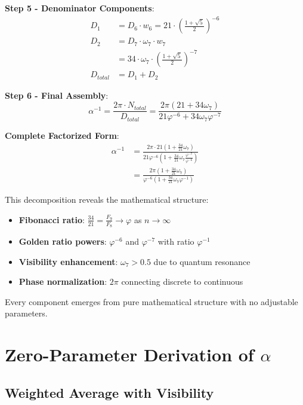 \documentclass[%
 reprint,
 amsmath,amssymb,
 aps,
 prd,
 10pt,
 nofootinbib,      %
 longbibliography  %
]{revtex4-2}
\theoremstyle{definition}
\theoremstyle{remark}
\begin{document}
\textbf{Step 5 - Denominator Components}:
\begin{align}
D_1 &= D_6 \cdot w_6 = 21 \cdot \left(\frac{1+\sqrt{5}}{2}\right)^{-6} \\
D_2 &= D_7 \cdot \omega_7 \cdot w_7 \\
&= 34 \cdot \omega_7 \cdot \left(\frac{1+\sqrt{5}}{2}\right)^{-7} \\
D_{total} &= D_1 + D_2
\end{align}

\textbf{Step 6 - Final Assembly}:
\begin{equation}
\boxed{
\alpha^{-1} = \frac{2\pi \cdot N_{total}}{D_{total}} = \frac{2\pi(21 + 34 \omega_7)}{21 \varphi^{-6} + 34 \omega_7 \varphi^{-7}}
}
\end{equation}

\textbf{Complete Factorized Form}:
\begin{align}
\alpha^{-1} &= \frac{2\pi \cdot 21(1 + \frac{34}{21}\omega_7)}{21 \varphi^{-6}(1 + \frac{34}{21}\omega_7 \frac{\varphi^{-7}}{\varphi^{-6}})} \\
&= \frac{2\pi(1 + \frac{34}{21}\omega_7)}{\varphi^{-6}(1 + \frac{34}{21}\omega_7 \varphi^{-1})}
\end{align}

This decomposition reveals the mathematical structure:
\begin{itemize}
\item \textbf{Fibonacci ratio}: $\frac{34}{21} = \frac{F_9}{F_8} \to \varphi$ as $n \to \infty$
\item \textbf{Golden ratio powers}: $\varphi^{-6}$ and $\varphi^{-7}$ with ratio $\varphi^{-1}$
\item \textbf{Visibility enhancement}: $\omega_7 > 0.5$ due to quantum resonance
\item \textbf{Phase normalization}: $2\pi$ connecting discrete to continuous
\end{itemize}

Every component emerges from pure mathematical structure with no adjustable parameters.

\section{Zero-Parameter Derivation of \texorpdfstring{$\alpha$}{α}}
\label{sec:derivation}

\subsection{Weighted Average with Visibility}
\end{document}
